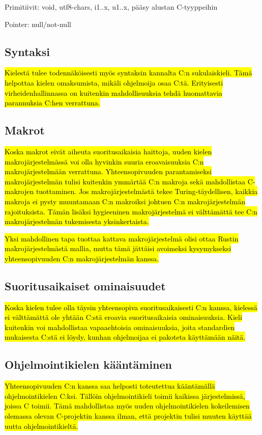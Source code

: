 Primitiivit: void, utf8-chars, i1..x, u1..x, pääsy alustan C-tyyppeihin

Pointer: null/not-null


\subsection{Syntaksi}

\hl{Kielestä tulee todennäköisesti myös syntaksin kannalta C:n sukulaiskieli.
Tämä helpottaa kielen omaksumista, mikäli ohjelmoija osaa C:tä. Erityisesti
virheidenhallinnassa on kuitenkin mahdollisuuksia tehdä huomattavia parannuksia
C:hen verrattuna.}

\subsection{Makrot}

\hl{Koska makrot eivät aiheuta suoritusaikaisia haittoja, uuden kielen
makrojärjestelmässä voi olla hyvinkin suuria eroavaisuuksia C:n
makrojärjestelmään verrattuna. Yhteensopivuuden parantamiseksi
makrojärjestelmän tulisi kuitenkin ymmärtää C:n makroja sekä mahdollistaa
C-makrojen tuottaminen. Jos makrojärjestelmästä tekee Turing-täydellisen,
kaikkia makroja ei pysty muuntamaan C:n makroiksi johtuen C:n makrojärjestelmän
rajoituksista. Tämän lisäksi hygieeninen makrojärjestelmä ei välttämättä tee
C:n makrojärjestelmän tukemisesta yksinkertaista.}

\hl{Yksi mahdollinen tapa tuottaa kattava makrojärjestelmä olisi ottaa Rustin
makrojärjestelmästä mallia, mutta tämä jättäisi avoimeksi kysymykseksi
yhteensopivuuden C:n makrojärjestelmän kanssa.}

\subsection{Suoritusaikaiset ominaisuudet}

\hl{Koska kielen tulee olla täysin yhteensopiva suoritusaikaisesti C:n kanssa,
kielessä ei välttämättä ole yhtään C:stä eroavia suoritusaikaisia
ominaisuuksia. Kieli kuitenkin voi mahdollistaa vapaaehtoisia ominaisuuksia,
joita standardien mukaisesta C:stä ei löydy, kunhan ohjelmoijaa ei pakoteta
käyttämään näitä.}

\subsection{Ohjelmointikielen kääntäminen}

\hl{Yhteensopivuuden C:n kanssa saa helposti toteutettua kääntämällä
ohjelmointikielen C:ksi. Tällöin ohjelmointikieli toimii kaikissa
järjestelmissä, joissa C toimii. Tämä mahdollistaa myös uuden ohjelmointikielen
kokeilemisen olemassa olevan C-projektin kanssa ilman, että projektin tulisi
muuten käyttää uutta ohjelmointikieltä.}
